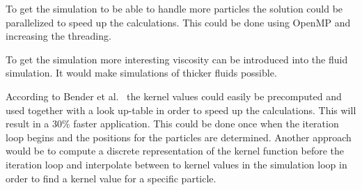     To get the simulation to be able to handle more particles the solution could be parallelized to speed up the calculations.
    This could be done using OpenMP and increasing the threading.

    To get the simulation more interesting viscosity can be introduced into the fluid simulation.
    It would make simulations of thicker fluids possible.

    According to Bender et al.~\cite{bender} the kernel values could easily be precomputed and used together with a look up-table in order to speed up the calculations. This will result in a $30\%$ faster application.  This could be done once when the iteration loop begins and the positions for the particles are determined. Another approach would be to compute a discrete representation of the kernel function before the iteration loop and interpolate between to kernel values in the simulation loop in order to find a kernel value for a specific particle. 





